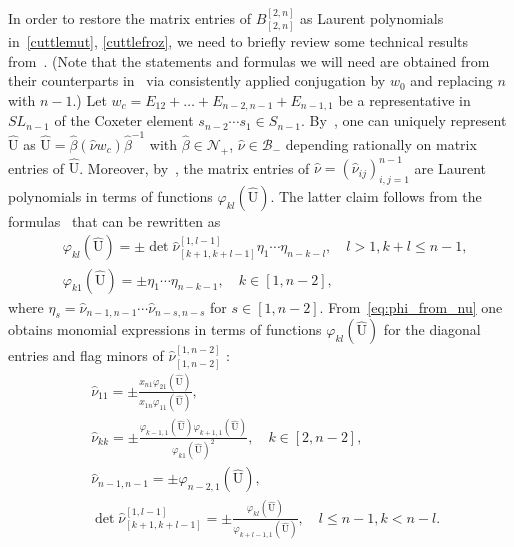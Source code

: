 \documentclass{amsart}
\theoremstyle{definition}
\theoremstyle{remark}
\numberwithin{equation}{section}
\numberwithin{theorem}{section}
\def\B{{\mathcal B}}
\def\N{\mathcal N}
\def\UU{\mathrm U}
\begin{document}
In order to restore the matrix entries of $B_{[2,n]}^{[2,n]}$ as Laurent polynomials in~\eqref{cuttlemut}, \eqref{cuttlefroz}, we need to briefly review some technical results from~\cite{GSVdouble}. (Note that the statements and formulas we will need are obtained from their counterparts in~\cite{GSVdouble} via consistently applied conjugation 
by $w_0$ and replacing $n$ with $n-1$.) Let $w_c = E_{12} + \ldots + E_{n-2, n-1} +E_{n-1,1}$ 
be a representative in $SL_{n-1}$ of the Coxeter element $s_{n-2}\cdots s_1\in S_{n-1}$. By~\cite[Lemma 8.2]{GSVdouble}, one can uniquely represent $\widehat{\UU}$ as
$\widehat{\UU} = \hat\beta  (\hat\nu w_c)  {\hat\beta}^{-1}$
with $\hat\beta \in \N_+$, $\hat\nu \in \B_-$ depending rationally on matrix entries of $\widehat{\UU}$.
Moreover, by~\cite[Section 7.3.2]{GSVdouble}, the matrix entries of $\hat\nu=\left (\hat\nu_{ij} \right )_{i,j=1}^{n-1}$ are Laurent polynomials in terms of functions  $\varphi_{kl}(\widehat{\UU})$.
The latter claim follows from the formulas~\cite[equation~(5.8)]{GSVdouble} that can be rewritten as
\begin{equation}
\label{eq:phi_from_nu}
\begin{aligned}
&\varphi_{kl}(\widehat{\UU}) = \pm\det \hat\nu^{[1,l-1]}_{[k+1,k+l-1]} \eta_1\cdots\eta_{n-k-l}, \quad l >1, k+l\leq n-1, \\ 
&\varphi_{k1}(\widehat{\UU}) = \pm\eta_1\cdots\eta_{n-k-1},\quad  k\in [1,n-2],
\end{aligned}
\end{equation}
where
$\eta_s= \hat\nu_{n-1,n-1} \cdots \hat\nu_{n-s,n-s}$ for  $s\in [1,n-2]$.
From~\eqref{eq:phi_from_nu} one obtains monomial expressions in terms of functions $\varphi_{kl}(\widehat{\UU})$ for the diagonal entries and flag minors of $\hat{\nu}_{[1,n-2]}^{[1,n-2]}$ :
\begin{equation}\label{eq:nu_from_phi}
\begin{aligned}
&\hat\nu_{11} = \pm \frac{x_{n1} \varphi_{21}(\widehat{\UU})}{x_{1n} \varphi_{11}(\widehat{\UU})},\\
&\hat\nu_{kk} = \pm\frac{\varphi_{k-1,1}(\widehat{\UU})\varphi_{k+1,1}(\widehat{\UU})}{\varphi_{k1}(\widehat{\UU})^2},\quad k\in [2,n-2],\\ 
&\hat\nu_{n-1,n-1} = \pm \varphi_{n-2,1}(\widehat{\UU}),\\ 
& \det \hat\nu^{[1,l-1]}_{[k+1,k+l-1]}=\pm \frac{\varphi_{kl}(\widehat{\UU})}{\varphi_{k+l-1,1}(\widehat{\UU})}, \quad
 l\leq n-1, k < n-l.
\end{aligned}
\end{equation}
\end{document}
